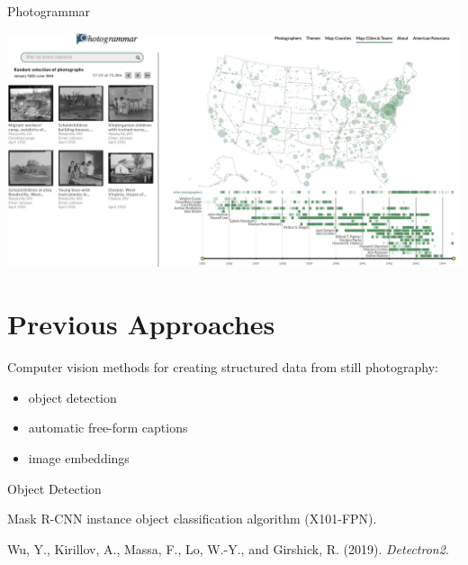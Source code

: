 \documentclass[12pt,ignorenonframetext,aspectratio=169]{beamer}
\makeatletter
\newcommand{\orange}[1]{\textcolor{solarized@orange}{#1}}
\makeatother
\begin{document}
\begin{frame}{Photogrammar}

\begin{center}
\includegraphics[height=0.8\textheight]{img/pgram1.jpg}
\end{center}

\end{frame}
%
%
%

\section{Previous Approaches}

\begin{frame}{}

Computer vision methods for creating structured data from still photography:

\begin{itemize}
\item object detection
\item automatic free-form captions
\item image embeddings
\end{itemize}

\end{frame}

\begin{frame}{Object Detection}

\orange{Mask R-CNN} instance object classification algorithm (X101-FPN).

Wu, Y., Kirillov, A., Massa, F., Lo, W.-Y., and Girshick, R. (2019). \textit{Detectron2}.

\end{frame}
\end{document}
